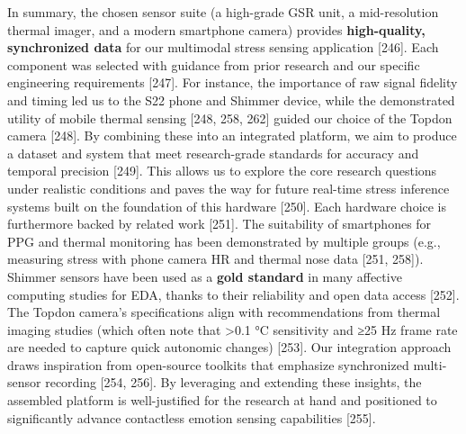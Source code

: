 \documentclass{article}
\begin{document}
    In summary, the chosen sensor suite (a high-grade GSR unit, a mid-resolution thermal imager, and a modern smartphone camera) provides \textbf{high-quality, synchronized data} for our multimodal stress sensing application [246]. Each component was selected with guidance from prior research and our specific engineering requirements [247]. For instance, the importance of raw signal fidelity and timing led us to the S22 phone and Shimmer device, while the demonstrated utility of mobile thermal sensing [248, 258, 262] guided our choice of the Topdon camera [248]. By combining these into an integrated platform, we aim to produce a dataset and system that meet research-grade standards for accuracy and temporal precision [249]. This allows us to explore the core research questions under realistic conditions and paves the way for future real-time stress inference systems built on the foundation of this hardware [250]. Each hardware choice is furthermore backed by related work [251]. The suitability of smartphones for PPG and thermal monitoring has been demonstrated by multiple groups (e.g., measuring stress with phone camera HR and thermal nose data [251, 258]). Shimmer sensors have been used as a \textbf{gold standard} in many affective computing studies for EDA, thanks to their reliability and open data access [252]. The Topdon camera’s specifications align with recommendations from thermal imaging studies (which often note that >0.1 °C sensitivity and ≥25 Hz frame rate are needed to capture quick autonomic changes) [253]. Our integration approach draws inspiration from open-source toolkits that emphasize synchronized multi-sensor recording [254, 256]. By leveraging and extending these insights, the assembled platform is well-justified for the research at hand and positioned to significantly advance contactless emotion sensing capabilities [255].
\end{document}
